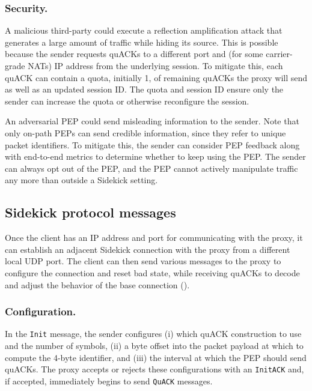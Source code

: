 \subsubsection{Security.}
A malicious third-party could execute a reflection amplification attack that
generates a large amount of traffic while hiding its source. This is
possible because the sender requests quACKs to a different port and (for some
carrier-grade NATs) IP address from the underlying session. To mitigate this,
each quACK can contain a quota, initially 1, of remaining quACKs the proxy
will send as well as an updated session ID\@.
The quota and session ID ensure only the sender can increase the quota or
otherwise reconfigure the session.

An adversarial PEP could send misleading information to the sender. Note that
only on-path PEPs can send credible information, since they refer to unique
packet identifiers.
To mitigate this, the sender can consider PEP feedback along with
end-to-end metrics to determine whether to keep using the PEP. The sender can
always opt out of the PEP, and the PEP cannot actively manipulate traffic any
more than outside a Sidekick setting.


\subsection{Sidekick protocol messages}
\label{sec:sidekick:design:messages}



Once the client has an IP address and port for communicating with the proxy, it
can establish an adjacent Sidekick connection with the proxy from a different
local UDP port. The client can then send various messages to the proxy to
configure the connection and reset bad state, while receiving quACKs to decode
and adjust the behavior of the base connection ().

\subsubsection{Configuration.}
In the \texttt{Init} message, the sender configures (i) which quACK construction
to use and the number of symbols, (ii) a byte offset into the packet payload at
which to compute the 4-byte identifier, and (iii) the interval at which the PEP
should send quACKs.
The proxy accepts or rejects these configurations with an \texttt{InitACK}
and, if accepted, immediately begins to send \texttt{QuACK} messages.

